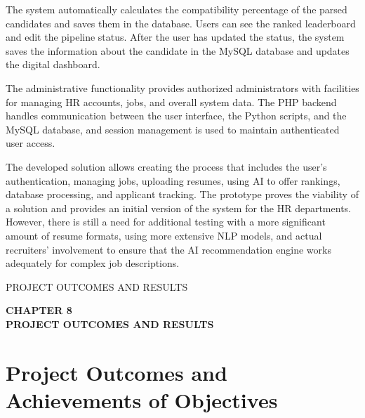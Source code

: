\documentclass[12pt,a4paper]{report}
\begin{document}
The system automatically calculates the compatibility percentage of the parsed
candidates and saves them in the database. Users can
see the ranked leaderboard and edit the pipeline status.
After the user has updated the status, the system saves the information about the candidate in the MySQL database and updates the digital dashboard.

The administrative functionality provides authorized administrators with
facilities for managing HR accounts, jobs, and overall system data. The PHP backend handles communication between the user
interface, the Python scripts, and the MySQL database, and session management is used to
maintain authenticated user access.

The developed solution allows creating the process that includes the user's
authentication, managing jobs, uploading resumes, using AI to offer
rankings, database processing, and applicant tracking. The prototype proves the viability of a solution and
provides an initial version of the system for the HR departments. However, there
is still a need for additional testing with a more significant amount of
resume formats, using more extensive NLP models, and actual recruiters' involvement to ensure
that the AI recommendation engine works adequately for complex job descriptions.

\clearpage


{\protect\numberline{\thechapter}PROJECT OUTCOMES AND RESULTS}

\thispagestyle{empty}

\vspace*{\fill}

\begin{center}
    {\fontsize{14pt}{17pt}\selectfont\textbf{CHAPTER 8}}\\[1cm]
    {\fontsize{14pt}{17pt}\selectfont\textbf{PROJECT OUTCOMES AND RESULTS}}
\end{center}

\vspace*{\fill}

\clearpage
\section{Project Outcomes and Achievements of Objectives}
\end{document}
